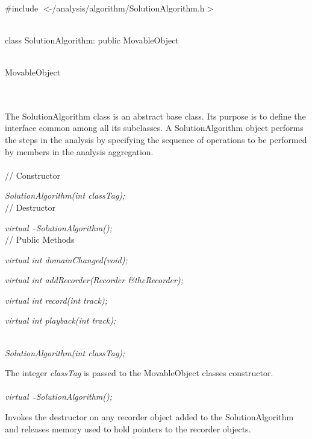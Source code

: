 
   \\
\#include $<\tilde{ }$/analysis/algorithm/SolutionAlgorithm.h$>$  


  \\
class SolutionAlgorithm: public MovableObject  


 \\
MovableObject 

\indent{} \\

 \\
\indent The SolutionAlgorithm class is an abstract base class. Its purpose
is to define the interface common among all its subclasses. A
SolutionAlgorithm object performs the steps in the analysis by specifying
the sequence of operations to be performed by members in the analysis
aggregation.\\


 \\
// Constructor 

{\em SolutionAlgorithm(int classTag);}\\  

// Destructor 

{\em virtual~ $\tilde{}$SolutionAlgorithm();}\\  

// Public Methods  

{\em virtual int domainChanged(void); } 

{\em virtual  int  addRecorder(Recorder \&theRecorder);}

{\em virtual int record(int track); } 

{\em virtual int playback(int track); } 



 \\
{\em SolutionAlgorithm(int classTag);}

The integer {\em classTag} is passed to the MovableObject classes
constructor. \\

 \\
{\em virtual~ $\tilde{}$SolutionAlgorithm();}

Invokes the destructor on any recorder object added to the
SolutionAlgorithm and releases memory used to hold pointers to the
recorder objects. \\



